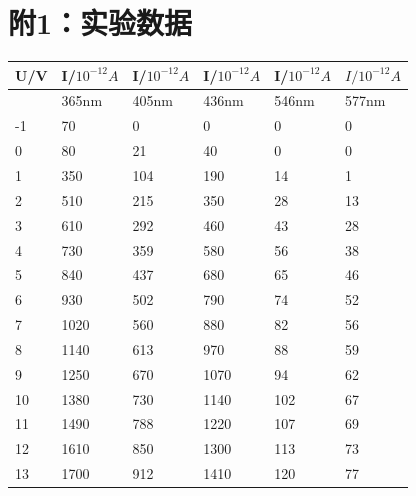 \documentclass[a4paper]{ltxdoc}
\begin{document}
\section*{附1：实验数据}
\small{
    \begin{longtable}{|l|l|l|l|l|l|}
        \hline
        U/V & I/$10^{-12}A$ & I/$10^{-12}A$ & I/$10^{-12}A$ & I/$10^{-12}A$ & $I/10^{-12}A$ \\ \hline
        ~   & 365nm         & 405nm         & 436nm         & 546nm         & 577nm         \\ \hline
        -1  & 70            & 0             & 0             & 0             & 0             \\ \hline
        0   & 80            & 21            & 40            & 0             & 0             \\ \hline
        1   & 350           & 104           & 190           & 14            & 1             \\ \hline
        2   & 510           & 215           & 350           & 28            & 13            \\ \hline
        3   & 610           & 292           & 460           & 43            & 28            \\ \hline
        4   & 730           & 359           & 580           & 56            & 38            \\ \hline
        5   & 840           & 437           & 680           & 65            & 46            \\ \hline
        6   & 930           & 502           & 790           & 74            & 52            \\ \hline
        7   & 1020          & 560           & 880           & 82            & 56            \\ \hline
        8   & 1140          & 613           & 970           & 88            & 59            \\ \hline
        9   & 1250          & 670           & 1070          & 94            & 62            \\ \hline
        10  & 1380          & 730           & 1140          & 102           & 67            \\ \hline
        11  & 1490          & 788           & 1220          & 107           & 69            \\ \hline
        12  & 1610          & 850           & 1300          & 113           & 73            \\ \hline
        13  & 1700          & 912           & 1410          & 120           & 77            \\ \hline

\end{longtable}}
\end{document}
